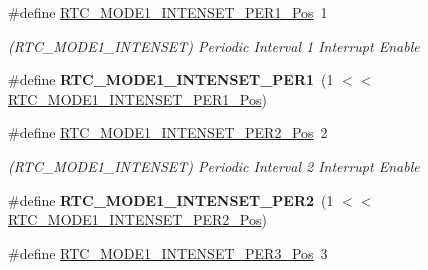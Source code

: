 \begin{DoxyCompactItemize}
\item 
\hypertarget{group___s_a_m_l21___r_t_c_gaabef31ac39043a8edaf89e92633007d0}{}\#define \hyperlink{group___s_a_m_l21___r_t_c_gaabef31ac39043a8edaf89e92633007d0}{R\+T\+C\+\_\+\+M\+O\+D\+E1\+\_\+\+I\+N\+T\+E\+N\+S\+E\+T\+\_\+\+P\+E\+R1\+\_\+\+Pos}~1\label{group___s_a_m_l21___r_t_c_gaabef31ac39043a8edaf89e92633007d0}

\begin{DoxyCompactList}\small\item\em (R\+T\+C\+\_\+\+M\+O\+D\+E1\+\_\+\+I\+N\+T\+E\+N\+S\+E\+T) Periodic Interval 1 Interrupt Enable \end{DoxyCompactList}\item 
\hypertarget{group___s_a_m_l21___r_t_c_ga33e9a0b5331690795504a8d1b9a35597}{}\#define {\bfseries R\+T\+C\+\_\+\+M\+O\+D\+E1\+\_\+\+I\+N\+T\+E\+N\+S\+E\+T\+\_\+\+P\+E\+R1}~(1 $<$$<$ \hyperlink{group___s_a_m_l21___r_t_c_gaabef31ac39043a8edaf89e92633007d0}{R\+T\+C\+\_\+\+M\+O\+D\+E1\+\_\+\+I\+N\+T\+E\+N\+S\+E\+T\+\_\+\+P\+E\+R1\+\_\+\+Pos})\label{group___s_a_m_l21___r_t_c_ga33e9a0b5331690795504a8d1b9a35597}

\item 
\hypertarget{group___s_a_m_l21___r_t_c_ga5892ad0f1193d20d486e8c2426dde964}{}\#define \hyperlink{group___s_a_m_l21___r_t_c_ga5892ad0f1193d20d486e8c2426dde964}{R\+T\+C\+\_\+\+M\+O\+D\+E1\+\_\+\+I\+N\+T\+E\+N\+S\+E\+T\+\_\+\+P\+E\+R2\+\_\+\+Pos}~2\label{group___s_a_m_l21___r_t_c_ga5892ad0f1193d20d486e8c2426dde964}

\begin{DoxyCompactList}\small\item\em (R\+T\+C\+\_\+\+M\+O\+D\+E1\+\_\+\+I\+N\+T\+E\+N\+S\+E\+T) Periodic Interval 2 Interrupt Enable \end{DoxyCompactList}\item 
\hypertarget{group___s_a_m_l21___r_t_c_gab0154ce94c876a838ebaf50072e8b760}{}\#define {\bfseries R\+T\+C\+\_\+\+M\+O\+D\+E1\+\_\+\+I\+N\+T\+E\+N\+S\+E\+T\+\_\+\+P\+E\+R2}~(1 $<$$<$ \hyperlink{group___s_a_m_l21___r_t_c_ga5892ad0f1193d20d486e8c2426dde964}{R\+T\+C\+\_\+\+M\+O\+D\+E1\+\_\+\+I\+N\+T\+E\+N\+S\+E\+T\+\_\+\+P\+E\+R2\+\_\+\+Pos})\label{group___s_a_m_l21___r_t_c_gab0154ce94c876a838ebaf50072e8b760}

\item 
\hypertarget{group___s_a_m_l21___r_t_c_gab1f7edcde7a3c1372465990a35982cd3}{}\#define \hyperlink{group___s_a_m_l21___r_t_c_gab1f7edcde7a3c1372465990a35982cd3}{R\+T\+C\+\_\+\+M\+O\+D\+E1\+\_\+\+I\+N\+T\+E\+N\+S\+E\+T\+\_\+\+P\+E\+R3\+\_\+\+Pos}~3\label{group___s_a_m_l21___r_t_c_gab1f7edcde7a3c1372465990a35982cd3}


\end{DoxyCompactItemize}
